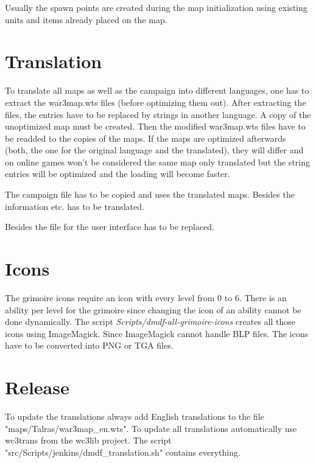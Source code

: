 \documentclass[a4paper,12pt,titlepage]{report}
\begin{document}
Usually the spawn points are created during the map initialization using existing units and items already placed on the map.

\newpage

\chapter{Translation}

To translate all maps as well as the campaign into different languages, one has to extract the war3map.wts files (before optimizing them out). After extracting the files, the entries have to be replaced by strings in another language. A copy of the unoptimized map must be created. Then the modified war3map.wts files have to be readded to the copies of the maps. If the maps are optimized afterwards (both, the one for the original language and the translated), they will differ and on online games won't be considered the same map only translated but the string entries will be optimized and the loading will become faster.

\vspace{\baselineskip}

The campaign file has to be copied and uses the translated maps. Besides the information etc. has to be translated.

\vspace{\baselineskip}

Besides the file for the user interface has to be replaced.

\newpage

\chapter{Icons}

The grimoire icons require an icon with every level from 0 to 6. There is an ability per level for the grimoire since changing the icon of an ability cannot be done dynamically. The script \emph{Scripts/dmdf-all-grimoire-icons} creates all those icons using ImageMagick. Since ImageMagick cannot handle BLP files. The icons have to be converted into PNG or TGA files.

\newpage

\chapter{Release}

To update the translations always add English translations to the file "maps/Talras/war3map_en.wts".
To update all translations automatically use wc3trans from the wc3lib project. The script "src/Scripts/jenkins/dmdf_translation.sh" contains everything.
\end{document}
